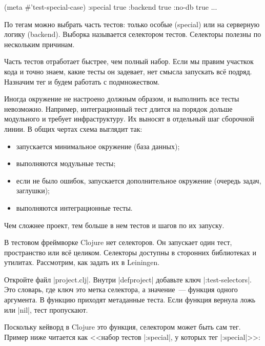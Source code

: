 \begin{english}
  \begin{clojure}
(meta #'test-special-case)
{:special true :backend true :no-db true ...}
  \end{clojure}
\end{english}

По тегам можно выбрать часть тестов: только особые (special) или на серверную
логику (backend). Выборка называется селектором тестов. Селекторы полезны по
нескольким причинам.

Часть тестов отработает быстрее, чем полный набор. Если мы правим участкок кода
и точно знаем, какие тесты он задевает, нет смысла запускать вс\"{е}
подряд. Назначим тег и будем работать с подмножеством.

Иногда окружение не настроено должным образом, и выполнить все тесты
невозможно. Например, интеграционный тест длится на порядок дольше модульного и
требует инфраструктуру. Их выносят в отдельный шаг сборочной линии. В общих
чертах схема выглядит так:

\begin{itemize}

\item
  запускается минимальное окружение (база данных);

\item
  выполняются модульные тесты;

\item
  если не было ошибок, запускается дополнительное окружение (очередь задач, заглушки);

\item
  выполняются интеграционные тесты.

\end{itemize}

Чем сложнее проект, тем больше в нем тестов и шагов по их запуску.

В тестовом фреймворке Clojure нет селекторов. Он запускает один тест,
пространство или вс\"{е} целиком. Селекторы доступны в сторонних библиотеках и
утилитах. Рассмотрим, как задать их в Leiningen.

Откройте файл \spverb|project.clj|. Внутри \spverb|defproject| добавьте ключ
\spverb|:test-selectors|. Это словарь, где ключ это метка селектора, а
значение~--- функция одного аргумента. В функцию приходят метаданные теста. Если
функция вернула ложь или \spverb|nil|, тест пропускают.

Поскольку кейворд в Clojure это функция, селектором может быть сам тег. Пример
ниже читается как <<набор тестов \spverb|:special|, у которых тег \spverb|:special|>>:

